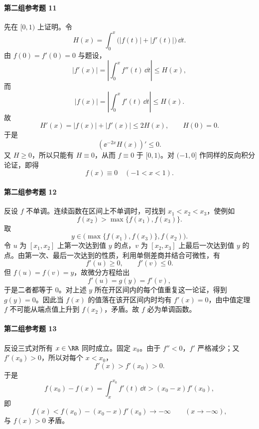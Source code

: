 \paragraph{第二组参考题 11}
\begin{xsolution}
先在 $[0,1)$ 上证明。令
\[
  H(x)=\int_0^x\bigl(|f(t)|+|f'(t)|\bigr)\,\dd t.
\]
由 $f(0)=f'(0)=0$ 与题设，
\[
  |f'(x)|
  =\left|\int_0^x f''(t)\,\dd t\right|
  \le H(x),
\]
而
\[
  |f(x)|
  =\left|\int_0^x f'(t)\,\dd t\right|
  \le H(x).
\]
故
\[
  H'(x)=|f(x)|+|f'(x)|\le2H(x),
  \qquad H(0)=0.
\]
于是
\[
  (\ee^{-2x}H(x))'\le0.
\]
又 $H\ge0$，所以只能有 $H\equiv0$，从而 $f\equiv0$ 于 $[0,1)$。对 $(-1,0]$ 作同样的反向积分论证，即得
\[
  \boxed{f(x)\equiv0\quad(-1<x<1)}.
\]
\end{xsolution}

\paragraph{第二组参考题 12}
\begin{xsolution}
反设 $f$ 不单调。连续函数在区间上不单调时，可找到 $x_1<x_2<x_3$，使例如
\[
  f(x_2)>\max\{f(x_1),f(x_3)\}.
\]
取
\[
  y\in\bigl(\max\{f(x_1),f(x_3)\},f(x_2)\bigr).
\]
令 $u$ 为 $[x_1,x_2]$ 上第一次达到值 $y$ 的点，$v$ 为 $[x_2,x_3]$ 上最后一次达到值 $y$ 的点。由第一次、最后一次达到的性质，利用单侧差商并结合可微性，有
\[
  f'(u)\ge0,
  \qquad
  f'(v)\le0.
\]
但 $f(u)=f(v)=y$，故微分方程给出
\[
  f'(u)=g(y)=f'(v),
\]
于是二者都等于 0。对上述 $y$ 所在开区间内的每个值重复这一论证，得到 $g(y)=0$。因此当 $f(x)$ 的值落在该开区间内时均有 $f'(x)=0$，由中值定理 $f$ 不可能从端点值上升到 $f(x_2)$，矛盾。故 $f$ 必为单调函数。
\end{xsolution}

\paragraph{第二组参考题 13}
\begin{xsolution}
反设三式对所有 $x\in\RR$ 同时成立。固定 $x_0$。由于 $f''<0$，$f'$ 严格减少；又 $f'(x_0)>0$，所以对每个 $x<x_0$，
\[
  f'(x)>f'(x_0)>0.
\]
于是
\[
  f(x_0)-f(x)
  =\int_x^{x_0}f'(t)\,\dd t
  >(x_0-x)f'(x_0),
\]
即
\[
  f(x)<f(x_0)-(x_0-x)f'(x_0)\to-\infty
  \qquad(x\to-\infty),
\]
与 $f(x)>0$ 矛盾。
\end{xsolution}


